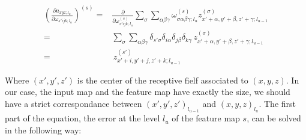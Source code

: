 \documentclass[final, paper=letter,5p,times,twocolumn]{elsarticle}
\begin{document}
\begin{equation*}
  \begin{split}
    \left( \frac{\partial a_{xyz;l_{u}}}{\partial \omega_{s'ijk;l_{u}}} \right)^{(s)} =& \frac{\partial }{\partial \omega_{s'ijk;l_{u}}^{(s)}}\sum_{\sigma}\sum_{\alpha \beta \gamma} \omega_{\sigma \alpha \beta \gamma;l_{u}}^{(s)}z_{x'+\alpha,y'+\beta,z'+\gamma;l_{u-1}}^{(\sigma)}\\
    =& \sum_{\sigma}\sum_{\alpha \beta \gamma} \delta_{s' \sigma} \delta_{i \alpha} \delta_{j \beta} \delta_{k \gamma} \, z_{x'+\alpha,y'+\beta,z'+\gamma;l_{u-1}}^{(\sigma)}\\
    =& \, z_{x'+i,y'+j,z'+k;l_{u-1}}^{(s')}
  \end{split}
\end{equation*}

Where $(x',y',z')$ is the center of the receptive fielf associated to $(x,y,z)$. In our case, the input map and the feature map have exactly the size, we should have a strict correspondance between $(x',y',z')_{l_{u-1}}$ and $(x,y,z)_{l_{u}}$. The first part of the equation, the error at the level $l_{u}$ of the feature map $s$, can be solved in the following way:

\end{document}
